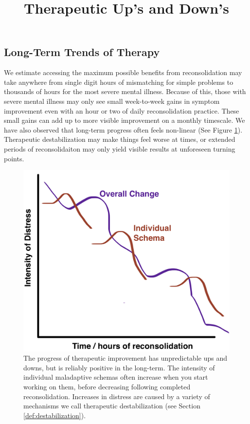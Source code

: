 \documentclass[12pt,letterpaper]{article}
\begin{document}
\subsection{Long-Term Trends of Therapy}
We estimate accessing the maximum possible benefits from reconsolidation may take anywhere from single digit hours of mismatching for simple problems to thousands of hours for the most severe mental illness. Because of this, those with severe mental illness may only see small week-to-week gains in symptom improvement even with an hour or two of daily reconsolidation practice. These small gains can add up to more visible improvement on a monthly timescale. We have also observed that long-term progress often feels non-linear (See Figure \ref{fig:ups-downs}). Therapeutic destabilization may make things feel worse at times, or extended periods of reconsolidaiton may only yield visible results at unforeseen turning points.
\begin{figure}
    \centering
    \title{Therapeutic Up's and Down's}
    \includegraphics[width=1\textwidth]{long-term ups and downs.jpg}
    \caption{The progress of therapeutic improvement has unpredictable ups and downs, but is reliably positive in the long-term. The intensity of individual maladaptive schemas often increase when you start working on them, before decreasing following completed reconsolidation. Increases in distress are caused by a variety of mechanisms we call therapeutic destabilization (see Section \ref{def:destabilization}).}
    \label{fig:ups-downs}
\end{figure}
\FloatBarrier
\end{document}
